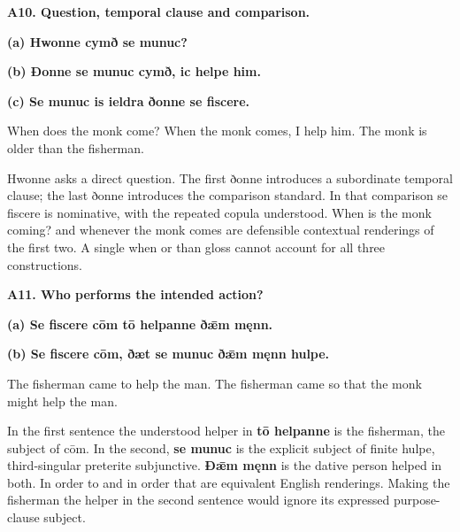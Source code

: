 \par\begin{minipage}{\linewidth}\raggedright
\textbf{A10. Question, temporal clause and comparison.}

\textbf{(a) Hwonne cymð se munuc?}

\textbf{(b) Ðonne se munuc cymð, ic helpe him.}

\textbf{(c) Se munuc is ieldra ðonne se fiscere.}

When does the monk come? When the monk comes, I help him. The monk is older than the fisherman.

Hwonne asks a direct question. The first ðonne introduces a subordinate temporal clause; the last ðonne introduces the comparison standard. In that comparison se fiscere is nominative, with the repeated copula understood. When is the monk coming? and whenever the monk comes are defensible contextual renderings of the first two. A single when or than gloss cannot account for all three constructions.

\end{minipage}\par\addvspace{4pt}

\par\begin{minipage}{\linewidth}\raggedright
\textbf{A11. Who performs the intended action?}

\textbf{(a) Se fiscere cōm tō helpanne ðǣm męnn.}

\textbf{(b) Se fiscere cōm, ðæt se munuc ðǣm męnn hulpe.}

The fisherman came to help the man. The fisherman came so that the monk might help the man.

In the first sentence the understood helper in \textbf{tō helpanne} is the fisherman, the subject of cōm. In the second, \textbf{se munuc} is the explicit subject of finite hulpe, third-singular preterite subjunctive. \textbf{Ðǣm męnn} is the dative person helped in both. In order to and in order that are equivalent English renderings. Making the fisherman the helper in the second sentence would ignore its expressed purpose-clause subject.

\end{minipage}\par\addvspace{4pt}

